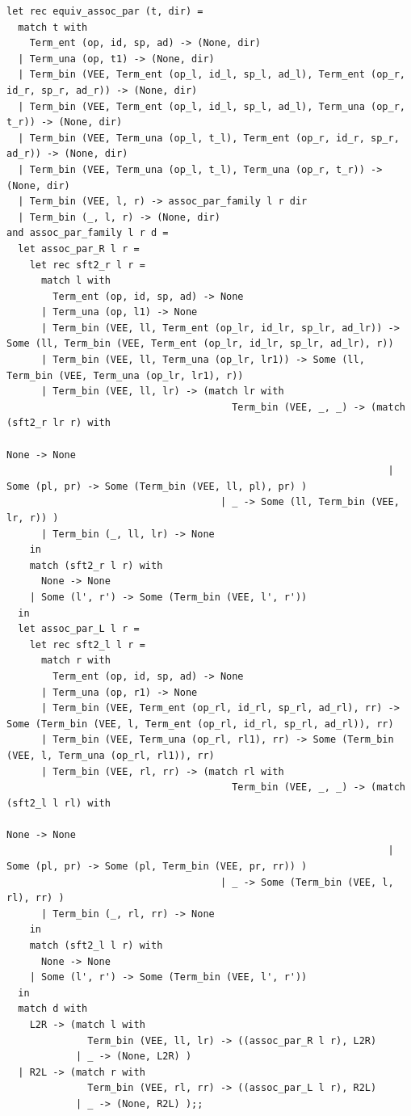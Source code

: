 \documentclass[12pt]{article}
\begin{document}
\begin{tiny}
\begin{verbatim}
let rec equiv_assoc_par (t, dir) =
  match t with
    Term_ent (op, id, sp, ad) -> (None, dir)
  | Term_una (op, t1) -> (None, dir)
  | Term_bin (VEE, Term_ent (op_l, id_l, sp_l, ad_l), Term_ent (op_r, id_r, sp_r, ad_r)) -> (None, dir)
  | Term_bin (VEE, Term_ent (op_l, id_l, sp_l, ad_l), Term_una (op_r, t_r)) -> (None, dir)
  | Term_bin (VEE, Term_una (op_l, t_l), Term_ent (op_r, id_r, sp_r, ad_r)) -> (None, dir)
  | Term_bin (VEE, Term_una (op_l, t_l), Term_una (op_r, t_r)) -> (None, dir)
  | Term_bin (VEE, l, r) -> assoc_par_family l r dir
  | Term_bin (_, l, r) -> (None, dir)
and assoc_par_family l r d =
  let assoc_par_R l r =
    let rec sft2_r l r =
      match l with
        Term_ent (op, id, sp, ad) -> None
      | Term_una (op, l1) -> None
      | Term_bin (VEE, ll, Term_ent (op_lr, id_lr, sp_lr, ad_lr)) -> Some (ll, Term_bin (VEE, Term_ent (op_lr, id_lr, sp_lr, ad_lr), r))
      | Term_bin (VEE, ll, Term_una (op_lr, lr1)) -> Some (ll, Term_bin (VEE, Term_una (op_lr, lr1), r))
      | Term_bin (VEE, ll, lr) -> (match lr with
                                       Term_bin (VEE, _, _) -> (match (sft2_r lr r) with
                                                                    None -> None
                                                                  | Some (pl, pr) -> Some (Term_bin (VEE, ll, pl), pr) )
                                     | _ -> Some (ll, Term_bin (VEE, lr, r)) )
      | Term_bin (_, ll, lr) -> None
    in
    match (sft2_r l r) with
      None -> None
    | Some (l', r') -> Some (Term_bin (VEE, l', r'))
  in
  let assoc_par_L l r =
    let rec sft2_l l r =
      match r with
        Term_ent (op, id, sp, ad) -> None
      | Term_una (op, r1) -> None
      | Term_bin (VEE, Term_ent (op_rl, id_rl, sp_rl, ad_rl), rr) -> Some (Term_bin (VEE, l, Term_ent (op_rl, id_rl, sp_rl, ad_rl)), rr)
      | Term_bin (VEE, Term_una (op_rl, rl1), rr) -> Some (Term_bin (VEE, l, Term_una (op_rl, rl1)), rr)
      | Term_bin (VEE, rl, rr) -> (match rl with
                                       Term_bin (VEE, _, _) -> (match (sft2_l l rl) with
                                                                    None -> None
                                                                  | Some (pl, pr) -> Some (pl, Term_bin (VEE, pr, rr)) )
                                     | _ -> Some (Term_bin (VEE, l, rl), rr) )
      | Term_bin (_, rl, rr) -> None
    in
    match (sft2_l l r) with
      None -> None
    | Some (l', r') -> Some (Term_bin (VEE, l', r'))
  in
  match d with
    L2R -> (match l with
              Term_bin (VEE, ll, lr) -> ((assoc_par_R l r), L2R)
            | _ -> (None, L2R) )
  | R2L -> (match r with
              Term_bin (VEE, rl, rr) -> ((assoc_par_L l r), R2L)
            | _ -> (None, R2L) );;





\end{verbatim}
\end{tiny}
\end{document}
